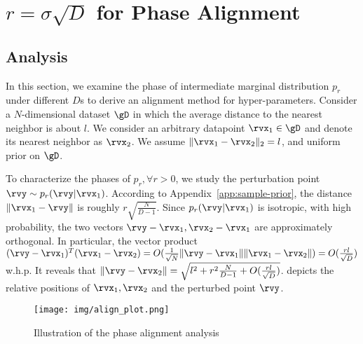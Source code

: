 \begin{comment}







\end{comment}

\section{$r=\sigma\sqrt{D}$ for Phase Alignment}
\subsection{Analysis}
\label{app:phase-align}



In this section, we examine the phase of intermediate marginal distribution $p_r$ under different $D$s to derive an alignment method for hyper-parameters. Consider a $N$-dimensional dataset $\gD$ in which the average distance to the nearest neighbor is about $l$. We consider an arbitrary datapoint $\rvx_1 \in \gD$ and denote its nearest neighbor as $\rvx_2$. We assume $\|\rvx_1 - \rvx_2\|_2=l$, and uniform prior on $\gD$.


To characterize the phases of $p_r, \forall r>0$, we study the perturbation point $\rvy \sim p_r(\rvy|\rvx_1)$. According to Appendix~\ref{app:sample-prior}, the distance $\|\rvx_1-\rvy\|$ is roughly $r\sqrt{\frac{N}{D-1}}$. Since $p_r(\rvy|\rvx_1)$ is isotropic, with high probability, the two vectors $\rvy-\rvx_1, \rvx_2-\rvx_1$ are approximately orthogonal. In particular, the vector product $(\rvy - \rvx_1)^T(\rvx_1 - \rvx_2)= O(\frac{1}{\sqrt{N}}\|\rvy - \rvx_1\|\|\rvx_1 - \rvx_2\|)=O(\frac{rl}{\sqrt{D}})$ w.h.p. It reveals that $\|\rvy-\rvx_2\| = \sqrt{l^2+r^2\frac{N}{D-1}+O(\frac{rl}{\sqrt{D}})}$.  depicts the relative positions of $\rvx_1, \rvx_2$ and the perturbed point $\rvy$.

\begin{figure*}[t]
\centering    \texttt{[image: img/align\_plot.png]}
    \caption{Illustration of the phase alignment analysis}
    \label{fig:align-analysis}
\end{figure*}

